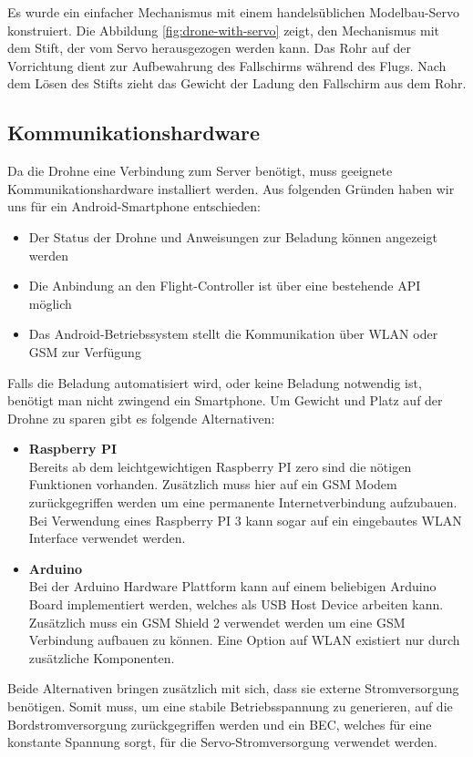 Es wurde ein einfacher Mechanismus mit einem handelsüblichen Modelbau-Servo konstruiert. Die Abbildung \ref{fig:drone-with-servo} zeigt, den Mechanismus mit dem Stift, der vom Servo herausgezogen werden kann. Das Rohr auf der Vorrichtung dient zur Aufbewahrung des Fallschirms während des Flugs. Nach dem Lösen des Stifts zieht das Gewicht der Ladung den Fallschirm aus dem Rohr.\\

\subsection{Kommunikationshardware}
\label{sec:communication-hardware}
Da die Drohne eine Verbindung zum Server benötigt, muss geeignete Kommunikationshardware installiert werden. Aus folgenden Gründen haben wir uns für ein Android-Smartphone entschieden:
\begin{itemize}
	\item{Der Status der Drohne und Anweisungen zur Beladung können angezeigt werden}
	\item{Die Anbindung an den Flight-Controller ist über eine bestehende API möglich}
	\item{Das Android-Betriebssystem stellt die Kommunikation über WLAN oder GSM zur Verfügung}
\end{itemize}

Falls die Beladung automatisiert wird, oder keine Beladung notwendig ist, benötigt man nicht zwingend ein Smartphone. Um Gewicht und Platz auf der Drohne zu sparen gibt es folgende Alternativen:
\begin{itemize}
	\item{\textbf{Raspberry PI} \\
	Bereits ab dem leichtgewichtigen Raspberry PI zero sind die nötigen Funktionen vorhanden. Zusätzlich muss hier auf ein GSM Modem zurückgegriffen werden um eine permanente Internetverbindung aufzubauen. Bei Verwendung eines Raspberry PI 3 kann sogar auf ein eingebautes WLAN Interface verwendet werden.
	}
	\item{\textbf{Arduino} \\
	Bei der Arduino Hardware Plattform kann auf einem beliebigen Arduino Board implementiert werden, welches als USB Host Device arbeiten kann. Zusätzlich muss ein GSM Shield 2 verwendet werden um eine GSM Verbindung aufbauen zu können. Eine Option auf WLAN existiert nur durch zusätzliche Komponenten.}
\end{itemize}

Beide Alternativen bringen zusätzlich mit sich, dass sie externe Stromversorgung benötigen. Somit muss, um eine stabile Betriebsspannung zu generieren, auf die Bordstromversorgung zurückgegriffen werden und ein \Gls{BEC}, welches für eine konstante Spannung sorgt, für die Servo-Stromversorgung verwendet werden. \\


